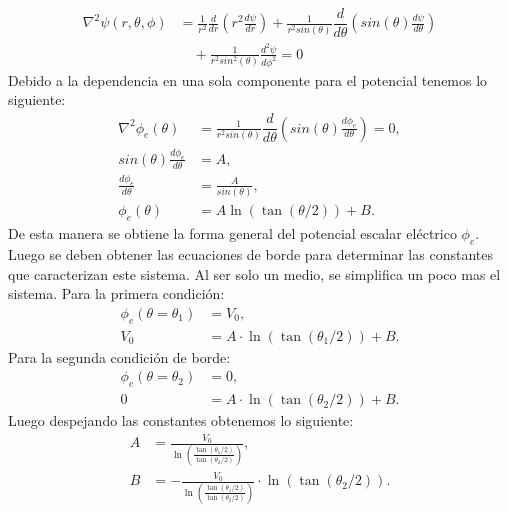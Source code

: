 \documentclass[
  11pt,
  letterpaper,
   addpoints,
   answers
  ]{exam}
\begin{document}
\begin{questions}
\begin{solution}
\begin{enumerate}
        \begin{equation}
            \begin{aligned}
                \nabla^{2}\psi (r,\theta,\phi) &= \frac{1}{r^{2}}\frac{d}{dr}\left(r^{2}\frac{d\psi}{dr}\right) + \frac{1}{r^{2}sin(\theta)}\dfrac{d}{d\theta}\left(sin(\theta) \frac{d\psi}{d\theta}\right) \\
                &\quad + \frac{1}{r^{2}sin^{2}(\theta) }\frac{d^{2}\psi}{d\phi^{2}} = 0
            \end{aligned}
        \end{equation}
        Debido a la dependencia en una sola componente para el potencial tenemos lo siguiente:
        \begin{equation}
            \begin{aligned}
                \nabla^{2}\phi_{e}(\theta) &=  \frac{1}{r^{2}sin(\theta)}\dfrac{d}{d\theta}\left(sin(\theta) \frac{d\phi_{e}}{d\theta}\right) = 0, \\
                sin(\theta) \frac{d\phi_{e}}{d\theta} &= A, \\
                \frac{d\phi_{e}}{d\theta} &= \frac{A}{sin(\theta)}, \\
                \phi_{e}(\theta) &= A\ln\left(\tan( \theta/2) \right) + B.
            \end{aligned}
        \end{equation}
        De esta manera se obtiene la forma general del potencial escalar eléctrico $\phi_{e}$. Luego se deben obtener las ecuaciones de borde para determinar las constantes que caracterizan este sistema. Al ser solo un medio, se simplifica un poco mas el sistema. Para la primera condición:
        \begin{equation}
            \begin{aligned}
                \phi_{e}(\theta = \theta_{1}) &= V_{0}, \\
                V_{0} &= A \cdot \ln\left(\tan(\theta_{1}/2)\right) + B.
            \end{aligned}
        \end{equation}
        Para la segunda condición de borde:
        \begin{equation}
            \begin{aligned}
                \phi_{e}(\theta = \theta_{2}) &= 0, \\
                0 &= A\cdot \ln\left(\tan(\theta_{2}/2)\right) + B.
            \end{aligned}
        \end{equation}
        Luego despejando las constantes obtenemos lo siguiente:
        \begin{equation}
            \begin{aligned}
                A &= \frac{V_{0}}{\ln\left(\frac{\tan(\theta_{1}/2)}{\tan(\theta_{2}/2)}\right)}, \\
                B &=  -\frac{V_{0}}{\ln\left(\frac{\tan(\theta_{1}/2)}{\tan(\theta_{2}/2)}\right)} \cdot \ln\left(\tan(\theta_{2}/2)\right).
            \end{aligned}
        \end{equation}
        

\end{enumerate}
\end{solution}
\end{questions}
\end{document}
